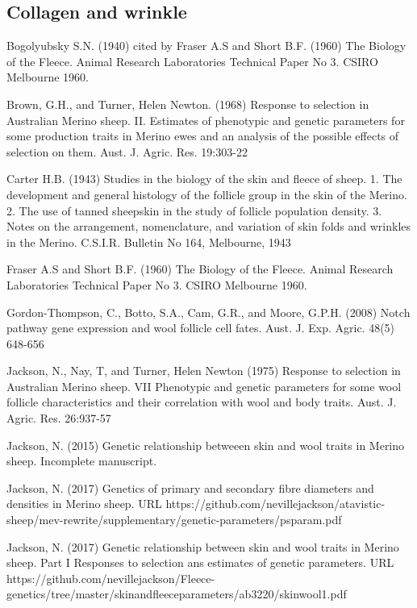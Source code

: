 \documentclass[titlepage]{article}  %
\begin{document}
\subsection{Collagen and wrinkle}


\clearpage
\begin{thebibliography}{99}

 Bogolyubsky S.N. (1940) cited by Fraser A.S and Short B.F. (1960) The Biology of the Fleece. Animal Research Laboratories Technical Paper No 3. CSIRO Melbourne 1960.

Brown, G.H., and Turner, Helen Newton. (1968) Response to selection in Australian Merino sheep. II. Estimates of phenotypic and genetic parameters for some production traits in Merino ewes and an analysis of the possible effects of selection on them. Aust. J. Agric. Res. 19:303-22

Carter H.B. (1943) Studies in the biology of the skin and fleece of sheep. 1. The development and general histology of the follicle group in the skin of the Merino. 2. The use of tanned sheepskin in the study of follicle population density. 3. Notes on the arrangement, nomenclature, and variation of skin folds and wrinkles in the Merino. C.S.I.R. Bulletin No 164, Melbourne, 1943

Fraser A.S and Short B.F. (1960) The Biology of the Fleece. Animal Research Laboratories Technical Paper No 3. CSIRO Melbourne 1960.

Gordon-Thompson, C., Botto, S.A., Cam, G.R., and Moore, G.P.H. (2008) Notch pathway gene expression and wool follicle cell fates. Aust. J. Exp. Agric. 48(5) 648-656

Jackson, N., Nay, T, and Turner, Helen Newton (1975) Response to selection in Australian Merino sheep. VII Phenotypic and genetic parameters for some wool follicle characteristics and their correlation with wool and body traits. Aust. J. Agric. Res. 26:937-57

Jackson, N. (2015) Genetic relationship betweeen skin and wool traits in Merino sheep. Incomplete manuscript.

Jackson, N. (2017) Genetics of primary and secondary fibre diameters and densities in Merino sheep. URL https://github.com/nevillejackson/atavistic-sheep/mev-rewrite/supplementary/genetic-parameters/psparam.pdf

Jackson, N. (2017) Genetic relationship between skin and wool traits in Merino sheep. Part I Responses to selection ans estimates of genetic parameters. URL https://github.com/nevillejackson/Fleece-genetics/tree/master/skinandfleeceparameters/ab3220/skinwool1.pdf


\end{thebibliography}
\end{document}
